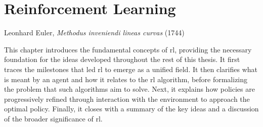 \chapter{Reinforcement Learning}
\label{chap:reinforcement_learning}

{Leonhard Euler, \textit{Methodus inveniendi lineas curvas} (1744)~\parencite{euler1744methodus}}

\chaptercontents

\glsresetall

This chapter introduces the fundamental concepts of \gls{rl}, providing the necessary foundation for the ideas developed throughout the rest of this thesis.
It first traces the milestones that led \gls{rl} to emerge as a unified field.
It then clarifies what is meant by an agent and how it relates to the \gls{rl} algorithm, before formalizing the problem that such algorithms aim to solve.
Next, it explains how policies are progressively refined through interaction with the environment to approach the optimal policy.
Finally, it closes with a summary of the key ideas and a discussion of the broader significance of \gls{rl}.





